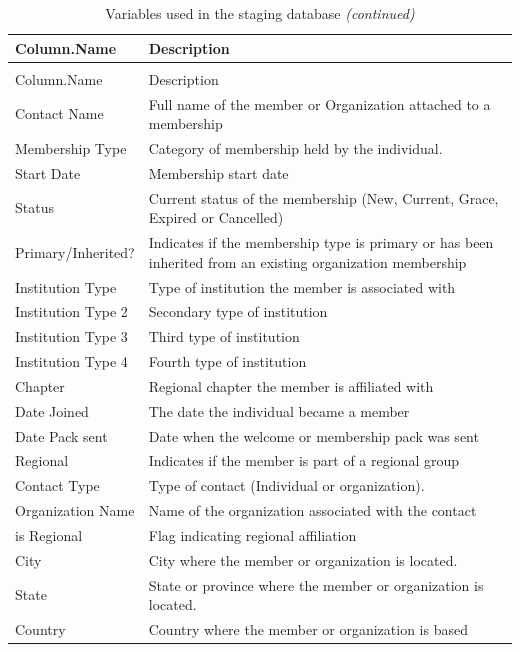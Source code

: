 \documentclass[11pt,a4paper,]{article}
\begin{document}
\begin{longtable}[t]{l>{\raggedright\arraybackslash}p{10cm}}
\caption{\label{tab:table-1}Variables used in the staging database}\\
\toprule
Column.Name & Description\\
\midrule
\endfirsthead
\caption[]{\label{tab:table-1}Variables used in the staging database \textit{(continued)}}\\
\toprule
Column.Name & Description\\
\midrule
\endhead

\endfoot
\bottomrule
\endlastfoot
Contact Name & Full name of the member or Organization attached to a membership\\
Membership Type & Category of membership held by the individual.\\
Start Date & Membership start date\\
Status & Current status of the membership (New, Current, Grace, Expired or Cancelled)\\
Primary/Inherited? & Indicates if the membership type is primary or has been inherited from an existing organization membership\\
\addlinespace
Institution Type & Type of institution the member is associated with\\
Institution Type 2 & Secondary type of institution\\
Institution Type 3 & Third type of institution\\
Institution Type 4 & Fourth type of institution\\
Chapter & Regional chapter the member is affiliated with\\
\addlinespace
Date Joined & The date the individual became a member\\
Date Pack sent & Date when the welcome or membership pack was sent\\
Regional & Indicates if the member is part of a regional group\\
Contact Type & Type of contact (Individual or organization).\\
Organization Name & Name of the organization associated with the contact\\
\addlinespace
is Regional & Flag indicating regional affiliation\\
City & City where the member or organization is located.\\
State & State or province where the member or organization is located.\\
Country & Country where the member or organization is based\\*
\end{longtable}
\end{document}
